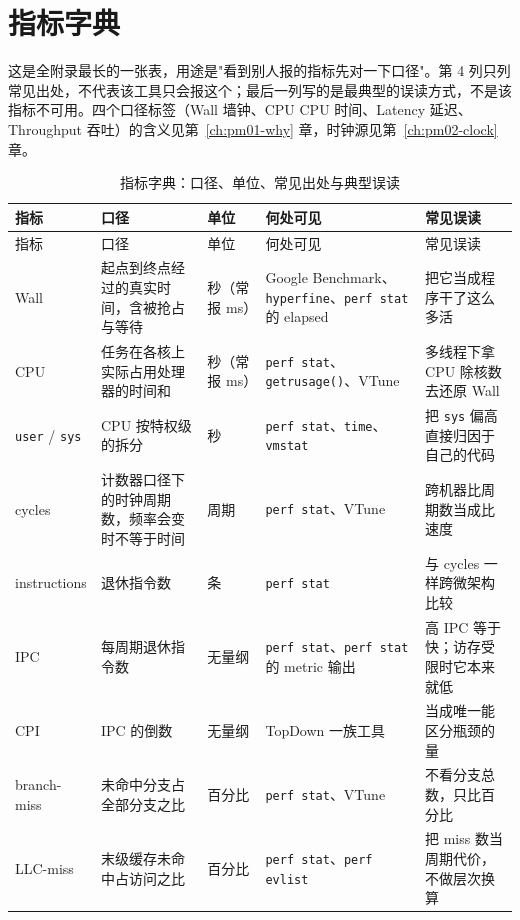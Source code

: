 \documentclass[12pt,a4paper,fontset=fandol]{ctexbook}
\newcommand{\Fn}[1]{\texttt{#1()}}
\newcommand{\Tp}[1]{\texttt{#1}}
\newcommand{\Lang}[1]{\textsf{#1}}
\newcommand{\MWall}{\Lang{Wall}}
\newcommand{\MCpu}{\Lang{CPU}}
\newcommand{\MLat}{\Lang{Latency}}
\newcommand{\MThr}{\Lang{Throughput}}
\newcommand{\Mx}[1]{\textsf{#1}}
\begin{document}
\section{指标字典}
\label{sec:pmapB-metric}

这是全附录最长的一张表，用途是"看到别人报的指标先对一下口径"。第 4 列只列常见出处，不代表该工具只会报这个；最后一列写的是最典型的误读方式，不是该指标不可用。四个口径标签（\MWall{} 墙钟、\MCpu{} CPU 时间、\MLat{} 延迟、\MThr{} 吞吐）的含义见第~\ref{ch:pm01-why} 章，时钟源见第~\ref{ch:pm02-clock} 章。

{\footnotesize
\begin{longtable}{>{\raggedright\arraybackslash}p{} >{\raggedright\arraybackslash}p{} >{\raggedright\arraybackslash}p{} >{\raggedright\arraybackslash}p{} >{\raggedright\arraybackslash}p{}}
\caption{指标字典：口径、单位、常见出处与典型误读}\label{tab:pmapB-metric}\\
\toprule
指标 & 口径 & 单位 & 何处可见 & 常见误读 \\
\midrule
\endfirsthead
\toprule
指标 & 口径 & 单位 & 何处可见 & 常见误读 \\
\midrule
\endhead
\bottomrule
\endlastfoot
\MWall{} & 起点到终点经过的真实时间，含被抢占与等待 & 秒（常报 ms） & Google Benchmark、\Tp{hyperfine}、\Tp{perf stat} 的 elapsed & 把它当成程序干了这么多活 \\
\MCpu{} & 任务在各核上实际占用处理器的时间和 & 秒（常报 ms） & \Tp{perf stat}、\Fn{getrusage}、VTune & 多线程下拿 \MCpu{} 除核数去还原 \MWall{} \\
\Tp{user} / \Tp{sys} & \MCpu{} 按特权级的拆分 & 秒 & \Tp{perf stat}、\Tp{time}、\Tp{vmstat} & 把 \Tp{sys} 偏高直接归因于自己的代码 \\
\Mx{cycles} & 计数器口径下的时钟周期数，频率会变时不等于时间 & 周期 & \Tp{perf stat}、VTune & 跨机器比周期数当成比速度 \\
\Mx{instructions} & 退休指令数 & 条 & \Tp{perf stat} & 与 \Mx{cycles} 一样跨微架构比较 \\
\Mx{IPC} & 每周期退休指令数 & 无量纲 & \Tp{perf stat}、\Tp{perf stat} 的 metric 输出 & 高 IPC 等于快；访存受限时它本来就低 \\
\Mx{CPI} & \Mx{IPC} 的倒数 & 无量纲 & TopDown 一族工具 & 当成唯一能区分瓶颈的量 \\
\Mx{branch-miss} & 未命中分支占全部分支之比 & 百分比 & \Tp{perf stat}、VTune & 不看分支总数，只比百分比 \\
\Mx{LLC-miss} & 末级缓存未命中占访问之比 & 百分比 & \Tp{perf stat}、\Tp{perf evlist} & 把 miss 数当周期代价，不做层次换算 \\

\end{longtable}}
\end{document}
